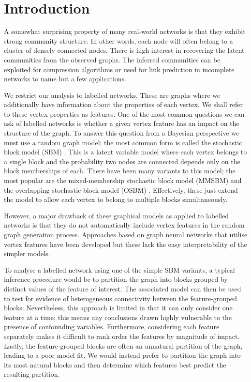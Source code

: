 \section{Introduction}

A somewhat surprising property of many real-world networks is that they exhibit strong community structure. In other words, each node will often belong to a cluster of densely connected nodes. There is high interest in recovering the latent communities from the observed graphs. The inferred communities can be exploited for compression algorithms \cite{cluster-compression} or used for link prediction in incomplete networks \cite{link-prediction} to name but a few applications.

We restrict our analysis to labelled networks. These are graphs where we additionally have information about the properties of each vertex. We shall refer to these vertex properties as features. One of the most common questions we can ask of labelled networks is whether a given vertex feature has an impact on the structure of the graph. To answer this question from a Bayesian perspective we must use a random graph model; the most common form is called the stochastic block model (SBM) \cite{vanilla-sbm}. This is a latent variable model where each vertex belongs to a single block and the probability two nodes are connected depends only on the block memberships of each. There have been many variants to this model; the most popular are the mixed-membership stochastic block model (MMSBM) \cite{mixed-membership-sbm} and the overlapping stochastic block model (OSBM) \cite{overlapping-sbm}. Effectively, these just extend the model to allow each vertex to belong to multiple blocks simultaneously.

However, a major drawback of these graphical models as applied to labelled networks is that they do not automatically include vertex features in the random graph generation process. Approaches based on graph neural networks \cite{sbm-gnn} that utilise vertex features have been developed but these lack the easy interpretability of the simpler models.

To analyse a labelled network using one of the simple SBM variants, a typical inference procedure would be to partition the graph into blocks grouped by distinct values of the feature of interest. The associated model can then be used to test for evidence of heterogeneous connectivity between the feature-grouped blocks. Nevertheless, this approach is limited in that it can only consider one feature at a time; this means any conclusions drawn highly vulnerable to the presence of confounding variables. Furthermore, considering each feature separately makes it difficult to rank order the features by  magnitude of impact. Lastly, the feature-grouped blocks are often an unnatural partition of the graph, leading to a poor model fit. We would instead prefer to partition the graph into its most natural blocks and then determine which features best predict the resulting partition.

